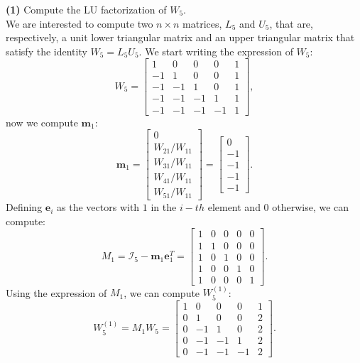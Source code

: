 \documentclass[a4paper]{report}
\numberwithin{equation}{chapter}
\begin{document}
\noindent \textbf{(1)} Compute the LU factorization of $W_5$.\\
We are interested to compute two $n \times n$ matrices, $L_5$ and $U_5$, that are, respectively, a unit lower triangular matrix and an upper triangular matrix that satisfy the identity $W_5 = L_5 U_5$. We start writing the expression of $W_5$:
\begin{equation}\label{key}
	W_5 = 
	\begin{bmatrix}
		1 & 0  & 0  & 0  & 1  \\
		-1 & 1 & 0 & 0 & 1 \\
		-1 & -1 & 1 & 0 & 1 \\
		-1 & -1 & -1 & 1 & 1 \\
		-1 & -1 & -1 & -1 & 1 
	\end{bmatrix},
\end{equation}
now we compute $\textbf{m}_1$:
\begin{equation}\label{key}
	\textbf{m}_1 = 
	\begin{bmatrix}
		0\\
		{W_{21}}/{W_{11}}\\
		{W_{31}}/{W_{11}}\\
		{W_{41}}/{W_{11}}\\
		{W_{51}}/{W_{11}}
	\end{bmatrix}=
	\begin{bmatrix}
	0\\
	-1\\
	-1\\
	-1\\
	-1
\end{bmatrix}.
\end{equation}
Defining $\textbf{e}_i$ as the vectors with $1$ in the $i-th$ element and $0$ otherwise, we can compute:
\begin{equation}\label{key}
	M_1=\mathcal{I}_5 - \textbf{m}_1 \textbf{e}_1^T =
		\begin{bmatrix}
		1 & 0  & 0  & 0  & 0  \\
		1 & 1 & 0 & 0 & 0\\
		1 & 0 & 1 & 0 & 0 \\
		1 & 0 & 0 & 1 & 0 \\
		1 & 0 & 0 & 0 & 1 
	\end{bmatrix}.
\end{equation}
Using the expression of $M_1$, we can compute $W_5^{(1)}$:
\begin{equation}\label{key}
	W_5^{(1)} = M_1 W_5 = 
	\begin{bmatrix}
		1 & 0  & 0  & 0  & 1  \\
		0 & 1 & 0 & 0 & 2 \\
		0 & -1 & 1 & 0 & 2 \\
		0 & -1 & -1 & 1 & 2 \\
		0 & -1 & -1 & -1 & 2 
	\end{bmatrix}.
\end{equation}
\end{document}

